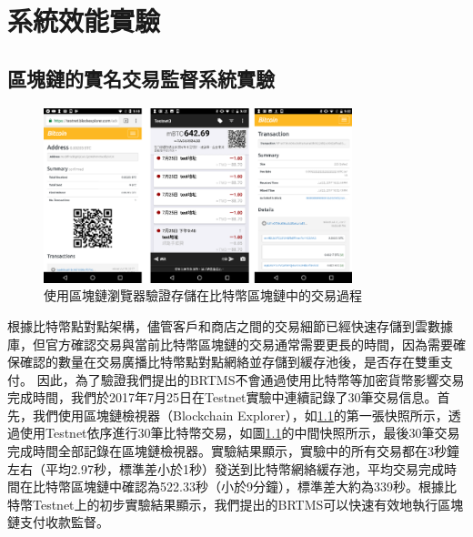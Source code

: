 \chapter{系統效能實驗}
	\section{區塊鏈的實名交易監督系統實驗}

		\begin{figure}[htbp]
			\centering
			\includegraphics[width = 0.8\textwidth]{fig9.png}
			\caption{使用區塊鏈瀏覽器驗證存儲在比特幣區塊鏈中的交易過程}\label{fig9}
		\end{figure}

		根據比特幣點對點架構，儘管客戶和商店之間的交易細節已經快速存儲到雲數據庫，但官方確認交易與當前比特幣區塊鏈的交易通常需要更長的時間，因為需要確保確認的數量在交易廣播比特幣點對點網絡並存儲到緩存池後，是否存在雙重支付。
		因此，為了驗證我們提出的BRTMS不會通過使用比特幣等加密貨幣影響交易完成時間，我們於2017年7月25日在Testnet實驗中連續記錄了30筆交易信息。首先，我們使用區塊鏈檢視器（Blockchain Explorer）\supercite{Blockchainexplorer:Ananalyticalprocessandinvestigationenvironmentforbitcoin}，如\ref{fig9}的第一張快照所示，透過使用Testnet依序進行30筆比特幣交易，如圖\ref{fig9}的中間快照所示，最後30筆交易完成時間全部記錄在區塊鏈檢視器。實驗結果顯示，實驗中的所有交易都在3秒鐘左右（平均2.97秒，標準差小於1秒）發送到比特幣網絡緩存池，平均交易完成時間在比特幣區塊鏈中確認為522.33秒（小於9分鐘），標準差大約為339秒。根據比特幣Testnet上的初步實驗結果顯示，我們提出的BRTMS可以快速有效地執行區塊鏈支付收款監督。

